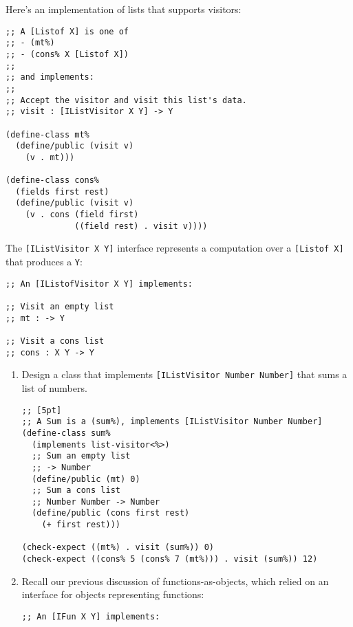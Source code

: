 \documentclass[12pt]{article}                   %
\def\pts#1{\marginpar{\footnotesize \raggedright  \fbox{#1 {\sc Points}}}}
\newenvironment{solution}{}{}
\begin{document}
\newpage
\begin{problem}\pts{11}

Here's an implementation of lists that supports visitors:

\begin{verbatim}
;; A [Listof X] is one of
;; - (mt%)
;; - (cons% X [Listof X])
;;
;; and implements:
;;
;; Accept the visitor and visit this list's data.
;; visit : [IListVisitor X Y] -> Y 

(define-class mt%
  (define/public (visit v)
    (v . mt)))

(define-class cons%
  (fields first rest)
  (define/public (visit v)
    (v . cons (field first) 
              ((field rest) . visit v))))
\end{verbatim}
%
The \verb|[IListVisitor X Y]| interface represents a computation over
a \verb|[Listof X]| that produces a \verb|Y|:
\begin{verbatim}
;; An [IListofVisitor X Y] implements:

;; Visit an empty list
;; mt : -> Y

;; Visit a cons list
;; cons : X Y -> Y
\end{verbatim}

\newpage
\begin{enumerate}

\item Design a class that implements
  \verb|[IListVisitor Number Number]| that sums a list of numbers.

\begin{solution}
\begin{verbatim}
;; [5pt]
;; A Sum is a (sum%), implements [IListVisitor Number Number]
(define-class sum%
  (implements list-visitor<%>)
  ;; Sum an empty list
  ;; -> Number
  (define/public (mt) 0)
  ;; Sum a cons list
  ;; Number Number -> Number
  (define/public (cons first rest)
    (+ first rest)))

(check-expect ((mt%) . visit (sum%)) 0)
(check-expect ((cons% 5 (cons% 7 (mt%))) . visit (sum%)) 12)
\end{verbatim}
\end{solution}

\newpage

\item Recall our previous discussion of functions-as-objects, which relied on an interface for objects representing functions:

\begin{verbatim}
;; An [IFun X Y] implements:


\end{verbatim}
\end{enumerate}
\end{problem}
\end{document}
